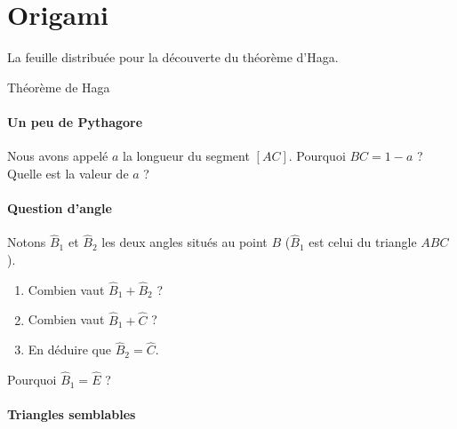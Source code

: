 
\section{Origami}

La feuille distribuée pour la découverte du théorème d'Haga.

\begin{feuilleExo}{Théorème de Haga}

    \begin{center}
    \end{center}

\paragraph{Un peu de Pythagore}


Nous avons appelé \( a\) la longueur du segment \( [AC]\). Pourquoi \( BC=1-a\) ? Quelle est la valeur de \( a\) ?

\paragraph{Question d'angle}

Notons \( \hat B_1\) et \( \hat B_2\) les deux angles situés au point \( B\) (\( \hat B_1\) est celui du triangle \( ABC\)).
\begin{enumerate}
    \item
        Combien vaut \( \hat B_1+\hat B_2\) ?
    \item
        Combien vaut \( \hat B_1+\hat C\) ?
    \item
        En déduire que \( \hat B_2=\hat C\).
\end{enumerate}
Pourquoi \( \hat B_1=\hat E\) ?

\paragraph{Triangles semblables}


\end{feuilleExo}
